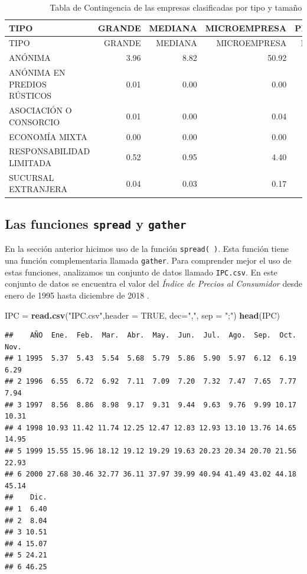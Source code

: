 \documentclass[
]{krantz}
\makeatletter
\newenvironment{Shaded}{\begin{snugshade}}{\end{snugshade}}
\newcommand{\DataTypeTok}[1]{\textcolor[rgb]{0.27,0.27,0.27}{#1}}
\newcommand{\KeywordTok}[1]{\textcolor[rgb]{0.27,0.27,0.27}{\textbf{#1}}}
\newcommand{\NormalTok}[1]{#1}
\newcommand{\OtherTok}[1]{\textcolor[rgb]{0.37,0.37,0.37}{#1}}
\newcommand{\StringTok}[1]{\textcolor[rgb]{0.5,0.5,0.5}{#1}}
\newenvironment{kframe}{%
\medskip{}
\setlength{\fboxsep}{.8em}
 \def\at@end@of@kframe{}%
 \ifinner\ifhmode%
  \def\at@end@of@kframe{\end{minipage}}%
  \begin{minipage}{\columnwidth}%
 \fi\fi%
 \def\FrameCommand##1{\hskip\@totalleftmargin \hskip-\fboxsep
 \colorbox{shadecolor}{##1}\hskip-\fboxsep
     \hskip-\linewidth \hskip-\@totalleftmargin \hskip\columnwidth}%
 \MakeFramed {\advance\hsize-\width
   \@totalleftmargin\z@ \linewidth\hsize
   \@setminipage}}%
 {\par\unskip\endMakeFramed%
 \at@end@of@kframe}
\renewenvironment{Shaded}{\begin{kframe}}{\end{kframe}}
\makeatother
\begin{document}
\begin{longtable}[]{@{}lrrrr@{}}
\caption{\label{tab:contpeqporc}Tabla de Contingencia de las empresas clasificadas por tipo y tamaño}\tabularnewline
\toprule
TIPO & GRANDE & MEDIANA & MICROEMPRESA & PEQUEÑA\tabularnewline
\midrule
\endfirsthead
\toprule
TIPO & GRANDE & MEDIANA & MICROEMPRESA & PEQUEÑA\tabularnewline
\midrule
\endhead
ANÓNIMA & 3.96 & 8.82 & 50.92 & 27.42\tabularnewline
ANÓNIMA EN PREDIOS RÚSTICOS & 0.01 & 0.00 & 0.00 & 0.03\tabularnewline
ASOCIACIÓN O CONSORCIO & 0.01 & 0.00 & 0.04 & 0.02\tabularnewline
ECONOMÍA MIXTA & 0.00 & 0.00 & 0.00 & 0.00\tabularnewline
RESPONSABILIDAD LIMITADA & 0.52 & 0.95 & 4.40 & 2.60\tabularnewline
SUCURSAL EXTRANJERA & 0.04 & 0.03 & 0.17 & 0.04\tabularnewline
\bottomrule
\end{longtable}

\newpage

\hypertarget{las-funciones-spread-y-gather}{%
\subsection{\texorpdfstring{Las funciones \texttt{spread} y \texttt{gather}}{Las funciones spread y gather}}\label{las-funciones-spread-y-gather}}

En la sección anterior hicimos uso de la función \texttt{spread(\ )}. Esta función tiene una función complementaria llamada \texttt{gather}. Para comprender mejor el uso de estas funciones, analizamos un conjunto de datos llamado \texttt{IPC.csv}. En este conjunto de datos se encuentra el valor del \emph{Índice de Precios al Consumidor} desde enero de 1995 hasta diciembre de 2018 \citep{msdr2017}.

\begin{Shaded}
\begin{Highlighting}[]
\NormalTok{IPC =}\StringTok{ }\KeywordTok{read.csv}\NormalTok{(}\StringTok{"IPC.csv"}\NormalTok{,}\DataTypeTok{header =} \OtherTok{TRUE}\NormalTok{, }\DataTypeTok{dec=}\StringTok{","}\NormalTok{, }\DataTypeTok{sep =} \StringTok{";"}\NormalTok{)}
\KeywordTok{head}\NormalTok{(IPC)}
\end{Highlighting}
\end{Shaded}

\begin{verbatim}
##    AÑO  Ene.  Feb.  Mar.  Abr.  May.  Jun.  Jul.  Ago.  Sep.  Oct.  Nov.
## 1 1995  5.37  5.43  5.54  5.68  5.79  5.86  5.90  5.97  6.12  6.19  6.29
## 2 1996  6.55  6.72  6.92  7.11  7.09  7.20  7.32  7.47  7.65  7.77  7.94
## 3 1997  8.56  8.86  8.98  9.17  9.31  9.44  9.63  9.76  9.99 10.17 10.31
## 4 1998 10.93 11.42 11.74 12.25 12.47 12.83 12.93 13.10 13.76 14.65 14.95
## 5 1999 15.55 15.96 18.12 19.12 19.29 19.63 20.23 20.34 20.70 21.56 22.93
## 6 2000 27.68 30.46 32.77 36.11 37.97 39.99 40.94 41.49 43.02 44.18 45.14
##    Dic.
## 1  6.40
## 2  8.04
## 3 10.51
## 4 15.07
## 5 24.21
## 6 46.25
\end{verbatim}
\end{document}
